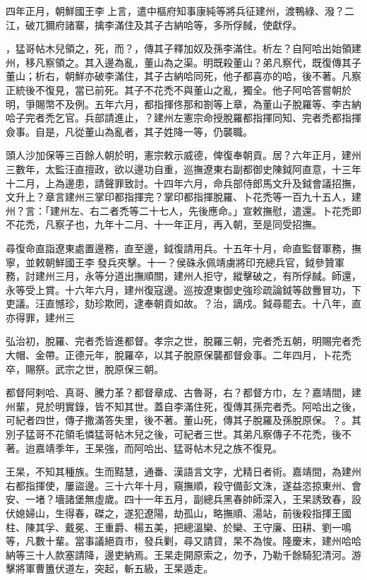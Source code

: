 \begin{pinyinscope}
四年正月，朝鮮國王李上言，遣中樞府知事康純等將兵征建州，渡鴨綠、潑？二江，破兀獮府諸寨，擒李滿住及其子古納哈等，多所俘馘，使獻俘。

，猛哥帖木兒領之，死，而？，傳其子釋加奴及孫李滿住。析左？自阿哈出始領建州，移凡察領之。其入邊為亂，董山為之渠。明既殺董山？弟凡察代，既復傳其子董山；析右，朝鮮亦破李滿住，其子古納哈同死，他子都喜亦的哈，後不著。凡察正統後不復見，當已前死。其子不花禿不與董山之亂，獨全。他子阿哈答嘗朝於明，爭賜幣不及例。五年六月，都指揮佟那和劄等上章，為董山子脫羅等、李古納哈子完者禿乞官。兵部請進止，？建州左憲宗命授脫羅都指揮同知、完者禿都指揮僉事。自是，凡從董山為亂者，其子姓降一等，仍襲職。

頭人沙加保等三百餘人朝於明，憲宗敕示威德，俾復奉朝貢。居？六年正月，建州三數年，太監汪直擅政，欲以邊功自重，巡撫遼東右副都御史陳鉞阿直意，十三年十二月，上為邊患，請聲罪致討。十四年六月，命兵部侍郎馬文升及鉞會議招撫，文升上？章言建州三掌印都指揮完？掌印都指揮脫羅、卜花禿等一百九十五人，建州？言：「建州左、右二者禿等二十七人，先後應命。」宣敕撫慰，遣還。卜花禿即不花禿，凡察子也，九年十二月、十一年正月，再入朝，至是同受招撫。

尋復命直詣遼東處置邊務，直至邊，鉞復請用兵。十五年十月，命直監督軍務，撫寧，並敕朝鮮國王李發兵夾擊。十一？侯硃永佩靖虜將印充總兵官，鉞參贊軍務，討建州三月，永等分道出撫順關，建州人拒守，縱擊破之，有所俘馘。師還，永等受上賞。十六年六月，建州復寇邊。巡按遼東御史強珍疏論鉞等啟釁冒功，下吏議。汪直憾珍，劾珍欺罔，逮奉朝貢如故。？治，謫戍。鉞尋罷去。十八年，直亦得罪，建州三

弘治初，脫羅、完者禿皆進都督。孝宗之世，脫羅三朝，完者禿五朝，明賜完者禿大帽、金帶。正德元年，脫羅卒，以其子脫原保襲都督僉事。二年四月，卜花禿卒，賜祭。武宗之世，脫原保三朝。

都督阿剌哈、真哥、騰力革？都督章成、古魯哥，右？都督方巾，左？嘉靖間，建州輩，見於明實錄，皆不知其世。蓋自李滿住死，復傳其孫完者禿。阿哈出之後，可紀者四世，傳子撒滿答失里，後不著。董山死，傳其子脫羅及孫脫原保。？。其別子猛哥不花領毛憐猛哥帖木兒之後，可紀者三世。其弟凡察傳子不花禿，後不著。迨嘉靖季年，王杲強，而阿哈出、猛哥帖木兒之族不復見。

王杲，不知其種族。生而黠慧，通番、漢語言文字，尤精日者術。嘉靖間，為建州右都指揮使，屢盜邊。三十六年十月，窺撫順，殺守備彭文洙，遂益恣掠東州、會安、一堵？墻諸堡無虛歲。四十一年五月，副總兵黑春帥師深入，王杲誘致春，設伏媳婦山，生得春，磔之，遂犯遼陽，劫孤山，略撫順、湯站，前後殺指揮王國柱、陳其孚、戴冕、王重爵、楊五美，把總溫欒、於欒、王守廉、田耕、劉一鳴等，凡數十輩。當事議絕貢市，發兵剿，尋又請貸，杲不為悛。隆慶末，建州哈哈納等三十人款塞請降，邊吏納焉。王杲走開原索之，勿予，乃勒千餘騎犯清河。游擊將軍曹簠伏道左，突起，斬五級，王杲遁走。


\end{pinyinscope}
